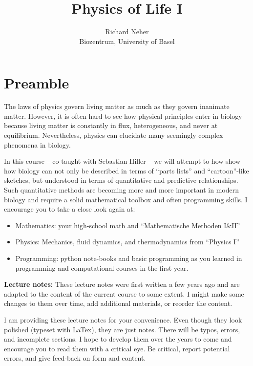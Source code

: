 \documentclass[a4]{book}
\author{Richard Neher\\Biozentrum, University of Basel}
\title{Physics of Life I}
\begin{document}
\maketitle

\chapter*{Preamble}

The laws of physics govern living matter as much as they govern inanimate matter.
However, it is often hard to see how physical principles enter in biology because living matter is constantly in flux, heterogeneous, and never at equilibrium.
Nevertheless, physics can elucidate many seemingly complex phenomena in biology.

In this course -- co-taught with Sebastian Hiller -- we will attempt to how show how biology can not only be described in terms of ``parts lists'' and ``cartoon''-like sketches, but understood in terms of quantitative and predictive relationships.
Such quantitative methods are becoming more and more important in modern biology and require a solid mathematical toolbox and often programming skills.
I encourage you to take a close look again at:
\begin{itemize}
	\item Mathematics: your high-school math and ``Mathematische Methoden I\&II''
	\item Physics: Mechanics, fluid dynamics, and thermodynamics from ``Physics I''
	\item Programming: python note-books and basic programming as you learned in programming and computational courses in the first year.
\end{itemize}

{\bf Lecture notes:}
These lecture notes were first written a few years ago and are adapted to the content of the current course to some extent.
I might make some changes to them over time, add additional materials, or reorder the content.

I am providing these lecture notes for your convenience.
Even though they look polished (typeset with LaTex), they are just notes.
There will be typos, errors, and incomplete sections.
I hope to develop them over the years to come and encourage you to read them with a critical eye.
Be critical, report potential errors, and give feed-back on form and content.
\end{document}
